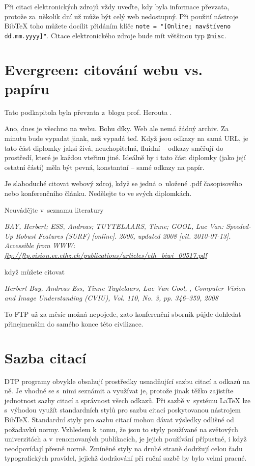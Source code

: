 Při citaci elektronických zdrojů vždy uveďte, kdy byla informace převzata, protože za~několik dní už může být celý web nedostupný. Při použití nástroje BibTeX toho můžete docílit přidáním klíče \verb|note = "[Online; navštíveno dd.mm.yyyy]"|. Citace elektronického zdroje bude mít většinou typ \verb|@misc|.

\section{Evergreen: citování webu vs. papíru}

Tato podkapitola byla převzata z~blogu prof. Herouta \cite{Herout}. 

Ano, dnes je všechno na webu. Bohu díky. Web ale nemá žádný archiv. Za minutu bude vypadat jinak, než vypadá teď. Když jsou odkazy na  samá URL, je tato část diplomky jaksi živá, neuchopitelná, fluidní -- odkazy směřují do prostředí, které je každou vteřinu jiné. Ideálně by i tato část diplomky (jako její ostatní části) měla být pevná, konstantní -- samé odkazy na papír.

Je slaboduché citovat webový zdroj, když se jedná o~uložené .pdf časopisového nebo konferenčního článku. Nedělejte to ve svých diplomkách. 
\bigskip

\noindent Neuvádějte v~seznamu literatury

\noindent \it BAY, Herbert; ESS, Andreas; TUYTELAARS, Tinne; GOOL, Luc Van: Speeded-Up Robust Features (SURF) [online]. 2006, updated 2008 [cit. 2010-07-13]. Accessible from WWW: \url{ftp://ftp.vision.ee.ethz.ch/publications/articles/eth\_biwi\_00517.pdf}
\bigskip
\rm

\noindent když můžete citovat

\noindent \it Herbert Bay, Andreas Ess, Tinne Tuytelaars, Luc Van Gool, , Computer Vision and Image Understanding (CVIU), Vol. 110, No. 3, pp. 346–359, 2008 
\bigskip
\rm

To FTP už za měsíc možná nepojede, zato konferenční sborník půjde dohledat přinejmenším do samého konce této civilizace.

\section{Sazba citací}

DTP programy obvykle obsahují prostředky usnadňující sazbu citací a odkazů na ně. Je vhodné se s~nimi seznámit a využívat je, protože jinak těžko zajistíte jednotnost sazby citací a správnost všech odkazů. Při sazbě v~systému \LaTeX{} lze s~výhodou využít standardních stylů pro sazbu citací poskytovanou nástrojem BibTeX. Standardní styly pro sazbu citací mohou dávat výsledky odlišné od požadavků normy. Vzhledem k~tomu, že jsou to styly používané na světových univerzitách a v~renomovaných publikacích, je jejich používání přípustné, i když neodpovídají přesně normě. Zmíněné styly na druhé straně dodržují celou řadu typografických pravidel, jejichž dodržování při ruční sazbě by bylo velmi pracné. 



